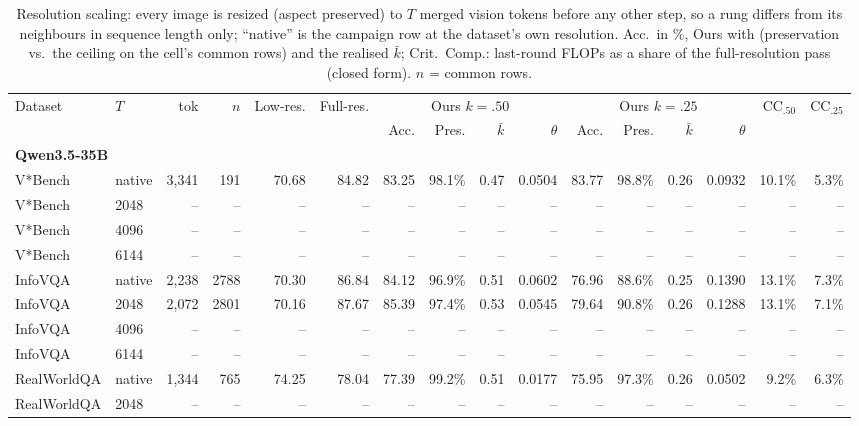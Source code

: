 \begin{table}[t]
\centering
\small
\caption{Resolution scaling: every image is resized (aspect preserved) to $T$ merged vision tokens before any other step, so a rung differs from its neighbours in sequence length only; ``native'' is the campaign row at the dataset's own resolution. Acc.\ in \%, Ours with (preservation vs.\ the ceiling on the cell's common rows) and the realised $\bar k$; Crit.\ Comp.: last-round FLOPs as a share of the full-resolution pass (closed form). $n$ = common rows.}
\label{tab:scaling}
\begin{tabular}{llrrrrrrrrrrrrrr}
\toprule
\multirow{2}{*}{Dataset} & \multirow{2}{*}{$T$} & \multirow{2}{*}{tok} & \multirow{2}{*}{$n$} & \multirow{2}{*}{Low-res.} & \multirow{2}{*}{Full-res.} & \multicolumn{4}{c}{Ours $k{=}.50$} & \multicolumn{4}{c}{Ours $k{=}.25$} & \multirow{2}{*}{CC$_{.50}$} & \multirow{2}{*}{CC$_{.25}$} \\
\cmidrule(lr){7-10} \cmidrule(lr){11-14}
 & & & & & & Acc. & Pres. & $\bar k$ & $\theta$ & Acc. & Pres. & $\bar k$ & $\theta$ & & \\
\midrule
\multicolumn{10}{l}{\textbf{Qwen3.5-35B}} \\
V*Bench & native & 3,341 & 191 & 70.68 & 84.82 & 83.25 & 98.1\% & 0.47 & 0.0504 & 83.77 & 98.8\% & 0.26 & 0.0932 & 10.1\% & 5.3\% \\
V*Bench & 2048 & -- & -- & -- & -- & -- & -- & -- & -- & -- & -- & -- & -- & -- & -- \\
V*Bench & 4096 & -- & -- & -- & -- & -- & -- & -- & -- & -- & -- & -- & -- & -- & -- \\
V*Bench & 6144 & -- & -- & -- & -- & -- & -- & -- & -- & -- & -- & -- & -- & -- & -- \\
InfoVQA & native & 2,238 & 2788 & 70.30 & 86.84 & 84.12 & 96.9\% & 0.51 & 0.0602 & 76.96 & 88.6\% & 0.25 & 0.1390 & 13.1\% & 7.3\% \\
InfoVQA & 2048 & 2,072 & 2801 & 70.16 & 87.67 & 85.39 & 97.4\% & 0.53 & 0.0545 & 79.64 & 90.8\% & 0.26 & 0.1288 & 13.1\% & 7.1\% \\
InfoVQA & 4096 & -- & -- & -- & -- & -- & -- & -- & -- & -- & -- & -- & -- & -- & -- \\
InfoVQA & 6144 & -- & -- & -- & -- & -- & -- & -- & -- & -- & -- & -- & -- & -- & -- \\
RealWorldQA & native & 1,344 & 765 & 74.25 & 78.04 & 77.39 & 99.2\% & 0.51 & 0.0177 & 75.95 & 97.3\% & 0.26 & 0.0502 & 9.2\% & 6.3\% \\
RealWorldQA & 2048 & -- & -- & -- & -- & -- & -- & -- & -- & -- & -- & -- & -- & -- & -- \\

\end{tabular}
\end{table}
